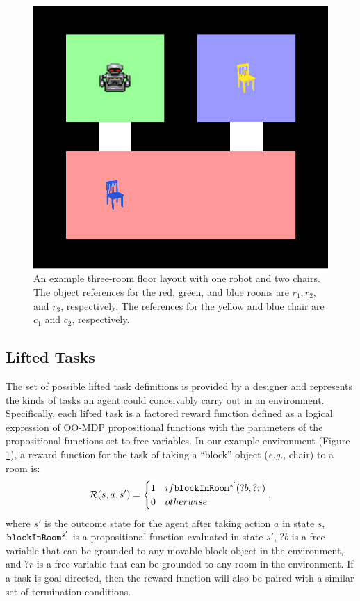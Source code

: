 \documentclass[conference]{IEEEtran}
\begin{document}
\begin{figure}[tbp]
\begin{center}
\includegraphics[width=0.7\columnwidth]{images/exampleFloor}
\caption{An example three-room floor layout with one robot and two chairs. The object references for the red, green, and blue rooms are $r_1, r_2,$ and $r_3$, respectively. The references for the yellow and blue chair are $c_1$ and $c_2$, respectively.
}
\label{fig:ef}
\end{center}
\end{figure}
\subsection{Lifted Tasks}
The set of possible lifted task definitions is provided by a designer and represents the kinds of tasks an agent could conceivably carry out in an environment. Specifically, each lifted task is a factored reward function defined as a logical expression of OO-MDP propositional functions with the parameters of the propositional functions set to free variables. In our example environment (Figure \ref{fig:ef}), a reward function for the task of taking a ``block'' object (\emph{e.g.}, chair) to a room is:
\begin{equation}
\label{eq:liftedrf}
{\cal R}(s, a, s') = \begin{cases}
1 & \mbox{if } {\tt blockInRoom}^{s'}(?b, ?r) \\
0 & \mbox{otherwise}
\end{cases},
\end{equation}
where $s'$ is the outcome state for the agent after taking action $a$ in state $s$, ${\tt blockInRoom}^{s'}$ is a propositional function evaluated in state $s'$, $?b$ is a free variable that can be grounded to any movable block object in the environment, and $?r$ is a free variable that can be grounded to any room in the environment. 
If a task is goal directed, then the reward function will also be paired with a similar set of termination conditions.
\end{document}
